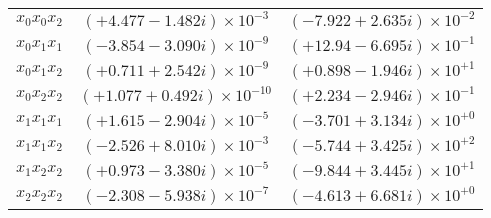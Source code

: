 \begin{table*}
\begin{tabular}{c | c | c}
            $x_{0}x_{0}x_{2}$ & $(+4.477 - 1.482i)\times10^{-3}$        & $(-7.922 + 2.635i)\times10^{-2}$ \\
            $x_{0}x_{1}x_{1}$ & $(-3.854 - 3.090i)\times10^{-9}$        & $(+12.94 - 6.695i)\times10^{-1}$ \\
            $x_{0}x_{1}x_{2}$ & $(+0.711 + 2.542i)\times10^{-9}$        & $(+0.898 - 1.946i)\times10^{+1}$ \\
            $x_{0}x_{2}x_{2}$ & $(+1.077 + 0.492i)\times10^{-10}$       & $(+2.234 - 2.946i)\times10^{-1}$ \\
            $x_{1}x_{1}x_{1}$ & $(+1.615 - 2.904i)\times10^{-5}$        & $(-3.701 + 3.134i)\times10^{+0}$ \\
            $x_{1}x_{1}x_{2}$ & $(-2.526 + 8.010i)\times10^{-3}$        & $(-5.744 + 3.425i)\times10^{+2}$ \\
            $x_{1}x_{2}x_{2}$ & $(+0.973 - 3.380i)\times10^{-5}$        & $(-9.844 + 3.445i)\times10^{+1}$ \\
            $x_{2}x_{2}x_{2}$ & $(-2.308 -5.938i)\times10^{-7}$        & $(-4.613 + 6.681i)\times10^{+0}$ \\
		\hline\hline
	\end{tabular} 
	\label{tab:coeffs_x1}
\end{table*}

